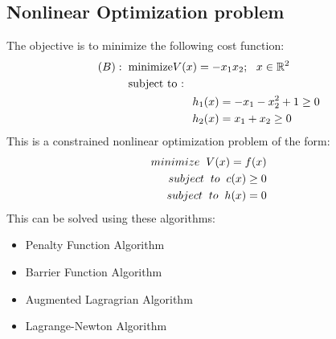 \clearpage
\subsection{Nonlinear Optimization problem}
The objective is to minimize the following cost function:
\begin{align}
(B) : \hspace{2mm}
& \mbox{minimize} V (x) = - x_1 x_2 ; \ \  x \in \mathbb{R}^2 \nonumber \\
& \mbox{subject to : } \nonumber \\
& \hspace{2cm} h_1(x)= -x_1 - x_2^2 +1  \geq 0 \nonumber \\
& \hspace{2cm} h_2(x)= x_1 + x_2 \geq 0 \nonumber
\end{align}
This is a constrained nonlinear optimization problem of the form:
\begin{align}
    minimize \hspace{2mm} V(x) = f(x) \\
    subject\hspace{2mm} to\hspace{2mm} c(x) \geq 0 \\
    subject\hspace{2mm} to \hspace{2mm}h(x) = 0 \\
\end{align}
This can be solved using these algorithms: 
\begin{itemize}
    \item Penalty Function Algorithm
    \item Barrier Function Algorithm
    \item Augmented Lagragrian Algorithm
    \item Lagrange-Newton Algorithm
\end{itemize}
